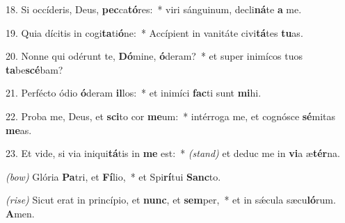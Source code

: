 18. Si occíderis, Deus, \textbf{pec}ca\textbf{tó}res:~* viri sánguinum, decli\textbf{ná}te \textbf{a} me.

19. Quia dícitis in cogi\textbf{ta}ti\textbf{ó}ne:~* Accípient in vanitáte civi\textbf{tá}tes \textbf{tu}as.

20. Nonne qui odérunt te, \textbf{Dó}mine, \textbf{ó}deram?~* et super inimícos tuos \textbf{ta}be\textbf{scé}bam?

21. Perfécto ódio \textbf{ó}deram \textbf{il}los:~* et inimíci \textbf{fac}ti sunt \textbf{mi}hi.

22. Proba me, Deus, et \textbf{sci}to cor \textbf{me}um:~* intérroga me, et cognósce \textbf{sé}mitas \textbf{me}as.

23. Et vide, si via iniqui\textbf{tá}tis in \textbf{me} est:~* {\color{red}\textit{(stand)}} et deduc me in \textbf{vi}a æ\textbf{tér}na.

{\color{red}\textit{(bow)}} Glória \textbf{Pa}tri, et \textbf{Fí}lio,~* et Spi\textbf{rí}tui \textbf{Sanc}to.

{\color{red}\textit{(rise)}} Sicut erat in princípio, et \textbf{nunc}, et \textbf{sem}per,~* et in s\'{\ae}cula sæcu\textbf{ló}rum. \textbf{A}men.